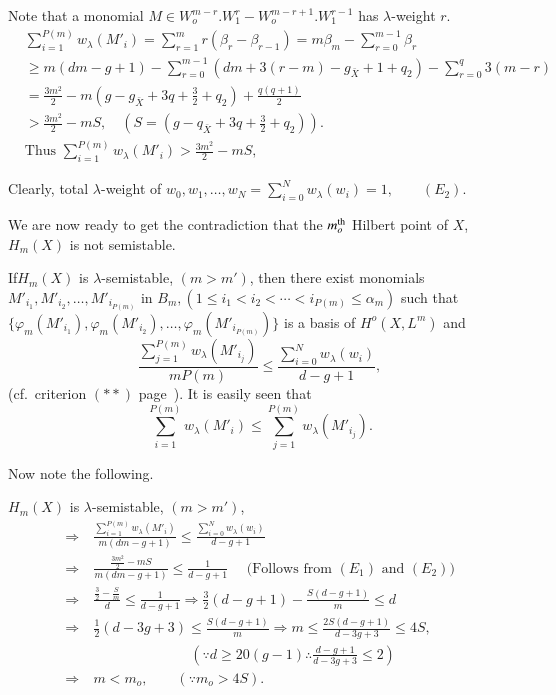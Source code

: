 {\noindent
Note that a monomial $M \in W^{m-r}_o. W^r_1
- W_o^{m-r+1}. W^{r-1}_1$ has $\lambda$-weight $r$.  
\begin{align*}
& \sum_{i = 1}^{P(m)} w_\lambda (M'_i) = \sum_{r = 1}^{m} r(\beta_r -
  \beta_{r-1}) = m\beta_m - \sum_{r = 0}^{m - 1} \beta_r\\ 
& \ge m(dm-g+1) - \sum_{r = 0}^{m - 1} (dm + 3(r-m) - g_{\bar{X}} +
  1 + q_2) - \sum_{r = 0}^{q} 3(m-r)\\ 
& = \frac{3m^2}{2} - m(g- g_{\bar{X}} + 3q + \frac{3}{2} + q_2) +
  \frac{q(q+1)}{2}\\ 
& > \frac{3m^2}{2} - mS, \quad (S = (g - q_{\bar{X}} + 3q + \frac{3}{2} +
  q_2)).\\
& \text{Thus } \sum\limits_{i = 1}^{P (m)} w_\lambda (M'_i) >
  \frac{3m^2}{2} - mS,  \tag*{$(E_1)$}
\end{align*}

\noindent
Clearly, total $\lambda$-weight of $w_0, w_1, \ldots , w_N =
\sum\limits_{i = 0}^{N} w_\lambda (w_i) = 1, \qquad (E_2)$. 

\noindent
We are now ready to get the contradiction that the $m_o^{\rm th}$ Hilbert
point of $X$, $H_m (X)$ is not semistable. 

If\pageoriginale $H_m (X) $ is $\lambda$-semistable, $(m > m')$, then
there exist 
monomials $M'_{i_1}, M'_{i_2}, \ldots , M'_{i_{P(m)}}$ in $B_{m}, (1 \le
i_1 < i_2 < \cdots < i_{P(m)} \le  \alpha_m)$ such that $\{ \varphi_m
(M'_{i_1}), \varphi_m (M'_{i_2}), \ldots , \varphi_m (M'_{i_{P (m)}}
)\}$ is a basis of $H^o (X, L^m)$ and 
$$\dfrac{\sum\limits_{j = 1}^{P
    (m)} w_\lambda (M'_{i_j})}{mP(m)} \le \dfrac{\sum\limits_{i =
    0}^{N} w_\lambda (w_i)}{d-g+1},$$ 
(cf.\ criterion $(**)$ 
page~\pageref{page10}). It is easily seen that 
$$\sum\limits_{i = 1}^{P(m)} w_\lambda
(M'_i) \le \sum\limits_{j = 1}^{P(m)} w_\lambda (M'_{i_j}).$$ 

Now note the following.

$H_m (X)$ is $\lambda$-semistable, $(m > m')$,
\begin{align*}
\Rightarrow & ~ \frac{\sum_{i = 1}^{P (m)}w_\lambda (M'_i)}{m
  (dm-g+1)} \le \frac{\sum_{i = 0}^{N} w_\lambda (w_i)}{d-g+1}\\ 
\Rightarrow & ~  \frac{\frac{3m^2}{2}- mS}{m (dm-g+1)} \le
\frac{1}{d-g+1} \quad \text{ (Follows from $(E_1)$ and $(E_2)$)}\\ 
\Rightarrow & ~ \frac{\frac{3}{2}- \frac{S}{m}}{d} \le \frac{1}{d-g+1}
\Rightarrow \frac{3}{2}(d-g+1) - \frac{S(d-g+1)}{m}  \le  d\\ 
\Rightarrow & ~ \frac{1}{2}(d-3g+3) \le \frac{S(d-g+1)}{m} 
\Rightarrow  m \le \frac{2S(d-g+1)}{d-3g+3} \le 4S,\\
& \hspace{3cm} (\because d \ge
20(g-1) \therefore \frac{d-g+1}{d-3g+3} \le 2)\\ 
\Rightarrow & ~ m < m_o, \qquad (\because m_o > 4S).
\end{align*}

}
